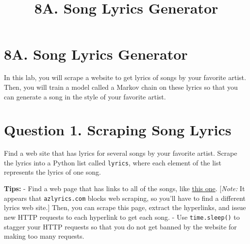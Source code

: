 \documentclass[11pt]{article}
\title{8A. Song Lyrics Generator}
\begin{document}
    
    
    \maketitle
    
    

    
    \hypertarget{a.-song-lyrics-generator}{%
\section{8A. Song Lyrics Generator}\label{a.-song-lyrics-generator}}

In this lab, you will scrape a website to get lyrics of songs by your
favorite artist. Then, you will train a model called a Markov chain on
these lyrics so that you can generate a song in the style of your
favorite artist.

\hypertarget{question-1.-scraping-song-lyrics}{%
\section{Question 1. Scraping Song
Lyrics}\label{question-1.-scraping-song-lyrics}}

Find a web site that has lyrics for several songs by your favorite
artist. Scrape the lyrics into a Python list called \texttt{lyrics},
where each element of the list represents the lyrics of one song.

\textbf{Tips:} - Find a web page that has links to all of the songs,
like \href{http://www.azlyrics.com/n/nirvana.html}{this one}.
{[}\emph{Note:} It appears that \texttt{azlyrics.com} blocks web
scraping, so you'll have to find a different lyrics web site.{]} Then,
you can scrape this page, extract the hyperlinks, and issue new HTTP
requests to each hyperlink to get each song. - Use \texttt{time.sleep()}
to stagger your HTTP requests so that you do not get banned by the
website for making too many requests.
\end{document}
